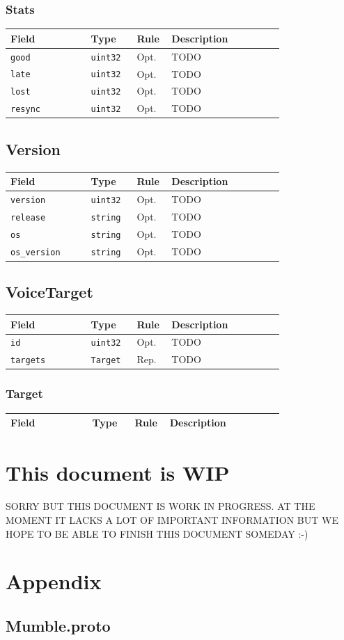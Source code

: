 \documentclass[11pt]{article} %
\newenvironment{mumbleMessageEx}
{%
	\small
	\renewcommand\arraystretch{1.5}
	\begin{tabular}{p{0.25\linewidth}p{0.13\linewidth}p{0.05\linewidth}p{0.35\linewidth}}
	Field & Type & Rule & Description \\
	\hline
}
{%
	\end{tabular}
	\renewcommand\arraystretch{1.0}
}
\newcommand{\mumbleMessageExItem}[4]{ \texttt{#1} & \texttt{#2} & #3 & #4 \\ }
\begin{document}
\subsubsection{Stats}

\begin{mumbleMessageEx}
\mumbleMessageExItem{good}{uint32}{Opt.}{TODO}
\mumbleMessageExItem{late}{uint32}{Opt.}{TODO}
\mumbleMessageExItem{lost}{uint32}{Opt.}{TODO}
\mumbleMessageExItem{resync}{uint32}{Opt.}{TODO}
\end{mumbleMessageEx}

\subsection{Version}

\begin{mumbleMessageEx}
\mumbleMessageExItem{version}{uint32}{Opt.}{TODO}
\mumbleMessageExItem{release}{string}{Opt.}{TODO}
\mumbleMessageExItem{os}{string}{Opt.}{TODO}
\mumbleMessageExItem{os\_version}{string}{Opt.}{TODO}
\end{mumbleMessageEx}

\subsection{VoiceTarget}

\begin{mumbleMessageEx}
\mumbleMessageExItem{id}{uint32}{Opt.}{TODO}
\mumbleMessageExItem{targets}{Target}{Rep.}{TODO}
\end{mumbleMessageEx}

\subsubsection{Target}

\begin{mumbleMessageEx}
\end{mumbleMessageEx}




\section {This document is WIP}
SORRY BUT THIS DOCUMENT IS WORK IN PROGRESS. AT THE MOMENT IT LACKS A LOT OF IMPORTANT INFORMATION BUT WE HOPE TO BE ABLE TO FINISH THIS DOCUMENT SOMEDAY :-)

\appendix
\section{Appendix}
\subsection{Mumble.proto}
\label{appendix:mumble_proto}
\end{document}
